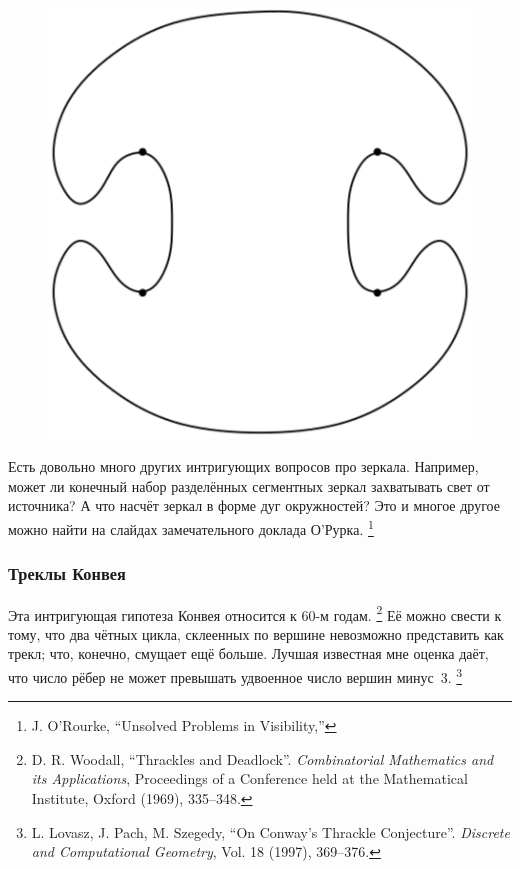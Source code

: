 \begin{figure}[h!]
\centering
\includegraphics[scale=0.5]{Figs/UnsolvedPuzzles/klee}
\end{figure} 

Есть довольно много других интригующих вопросов про зеркала.
Например, может ли конечный набор разделённых сегментных зеркал захватывать свет от источника?
А что насчёт зеркал в форме дуг окружностей?
Это и многое другое можно найти на слайдах замечательного доклада О’Рурка.%
\footnote{J. O'Rourke, ``Unsolved Problems in Visibility,''
}

\subsubsection*{Треклы Конвея}

Эта интригующая гипотеза Конвея относится к 60-м годам.%
\footnote{D. R. Woodall, ``Thrackles and Deadlock''. \emph{Combinatorial Mathematics and its Applications}, Proceedings of a Conference held at the Mathematical Institute, Oxford (1969), 335--348.}
Её можно свести к тому, что два чётных цикла, склеенных по вершине невозможно представить как трекл;
что, конечно, смущает ещё больше.
Лучшая известная мне оценка даёт, что число рёбер не может превышать удвоенное число вершин минус~3.%
\footnote{L. Lovasz, J. Pach, M. Szegedy, ``On Conway's Thrackle Conjecture''. \emph{Discrete and Computational Geometry}, Vol. 18 (1997), 369--376.}


